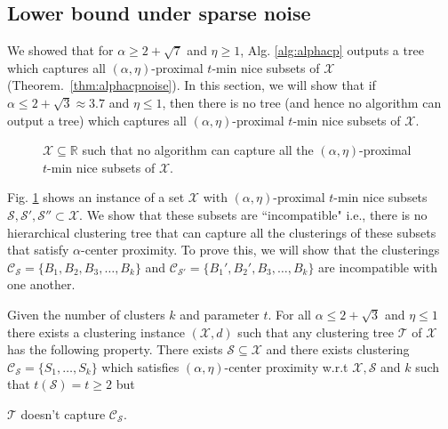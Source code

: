 \documentclass[anon,12pt]{colt2016} %
\newcommand{\mc}{\mathcal}
\begin{document}

\subsection{Lower bound under sparse noise}
\label{section:alphaLowerBoundSparse}

We showed that for $\alpha \ge 2 + \sqrt{7}$ and $\eta \ge 1$, Alg. \ref{alg:alphacp} outputs a tree which captures all $(\alpha, \eta)$-proximal $t$-min nice subsets of $\mc X$ (Theorem.~\ref{thm:alphacpnoise}). In this section, we will show that if $\alpha \le 2 + \sqrt{3} \approx 3.7$ and $\eta \le 1$, then there is no tree (and hence no algorithm can output a tree) which captures all $(\alpha, \eta)$-proximal $t$-min nice subsets of $\mc X$.

\begin{figure}

\caption{$\mc X \subseteq \mathbb{R}$ such that no algorithm can capture all the $(\alpha, \eta)$-proximal $t$-min nice subsets of $\mc X$.}
\label{fig:noalgalphacp}
\end{figure}

Fig. \ref{fig:noalgalphacp} shows an instance of a set $\mc X$ with $(\alpha, \eta)$-proximal $t$-min nice subsets $\mc S, \mc S', \mc S'' \subset \mc X$. We show that these subsets are ``incompatible" i.e., there is no  hierarchical clustering tree that can capture all the clusterings of these subsets that satisfy $\alpha$-center proximity. To prove this, we will show that the clusterings $\mc C_{\mc S} = \{B_1, B_2, B_3, \ldots, B_k\}$ and $\mc C_{\mc S'} = \{B_1', B_2', B_3, \ldots, B_k\}$ are incompatible with one another.

\begin{theorem}
\label{thm:noalgalphacp}
Given the number of clusters $k$ and parameter $t$. For all $\alpha \le 2+\sqrt{3}$ and $\eta \le 1$ there exists a clustering instance $(\mc X, d)$ such that any clustering tree $\mc T$ of $\mc X$ has  the following property. There exists $\mc S \subseteq \mc X$ and there exists clustering $\mc C_{\mc S} = \{S_1, \ldots, S_k\}$ which satisfies $(\alpha, \eta)$-center proximity w.r.t $\mc X, \mc S$ and $k$ such that $ t(\mc S) = t \ge 2$ but 

$\mc T$ doesn't capture $\mc C_{\mc S}$.
\end{theorem}
\end{document}
